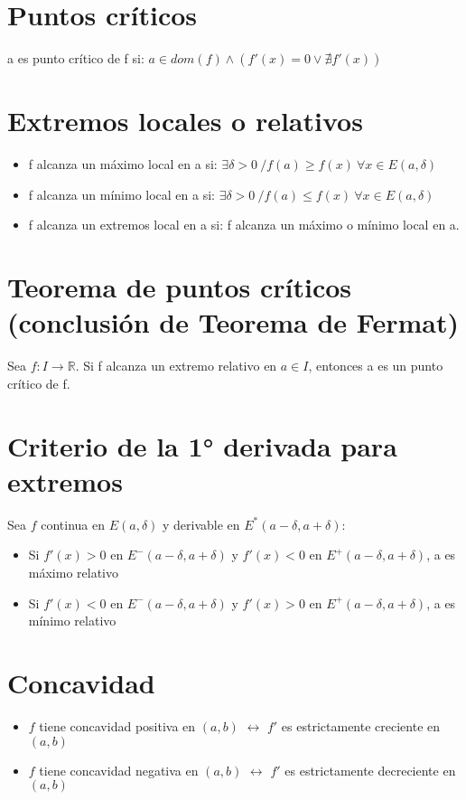 \documentclass{report}
\begin{document}
	\section{Puntos críticos}
		a es punto crítico de f si: $a \in dom(f) \wedge (f'(x)=0 \vee \nexists f'(x))$
		
	\section{Extremos locales o relativos}
	
		\begin{itemize}
			\item f alcanza un máximo local en a si: $\exists \delta >0 \ /f(a) \geq f(x) \ \forall x \in E(a,\delta)$
			\item f alcanza un mínimo local en a si: $\exists \delta >0 \ /f(a) \leq f(x) \ \forall x \in E(a,\delta)$
			\item f alcanza un extremos local en a si: f alcanza un máximo o mínimo local en a.
		\end{itemize}
	
	\section{Teorema de puntos críticos (conclusión de Teorema de Fermat)}
		Sea $f:I \to \mathbb{R}$. Si f alcanza un extremo relativo en $a \in I$, entonces a es un punto crítico de f.
		
	\section{Criterio de la 1° derivada para extremos}
		Sea $f$ continua en $E(a,\delta)$ y derivable en $E^*(a-\delta,a+\delta)$:
		
		\begin{itemize}
			\item Si $f'(x)>0$ en $E^-(a-\delta,a+\delta)$ y $f'(x)<0$ en $E^+(a-\delta,a+\delta)$, a es máximo relativo
			\item Si $f'(x)<0$ en $E^-(a-\delta,a+\delta)$ y $f'(x)>0$ en $E^+(a-\delta,a+\delta)$, a es mínimo relativo
		\end{itemize}
	\section{Concavidad}
		\begin{itemize}
			\item $f$ tiene concavidad positiva en $(a,b)$ $\leftrightarrow$ $f'$ es estrictamente creciente en $(a,b)$
			\item $f$ tiene concavidad negativa en $(a,b)$ $\leftrightarrow$ $f'$ es estrictamente decreciente en $(a,b)$
		\end{itemize}
\end{document}

